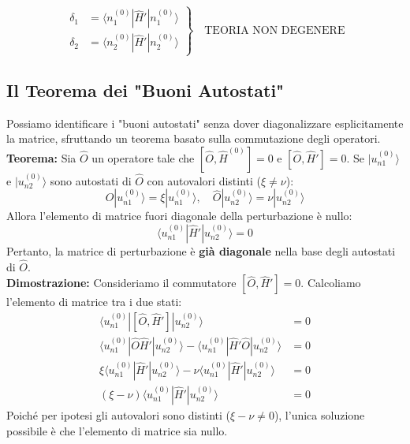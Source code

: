 \documentclass[11pt, a4paper]{article}
\begin{document}
\begin{equation*}
\left.
\begin{aligned}
\delta_1 &= \langle n_1^{(0)} | \hat{H}' | n_1^{(0)} \rangle \\
\delta_2 &= \langle n_2^{(0)} | \hat{H}' | n_2^{(0)} \rangle
\end{aligned}
\right\} \quad \text{TEORIA NON DEGENERE}
\end{equation*}

\subsection{Il Teorema dei "Buoni Autostati"}

Possiamo identificare i "buoni autostati" senza dover diagonalizzare esplicitamente la matrice, sfruttando un teorema basato sulla commutazione degli operatori.\\

\noindent
\textbf{Teorema:}
Sia $\hat{O}$ un operatore tale che $[\hat{O}, \hat{H}^{(0)}] = 0$ e $[\hat{O}, \hat{H}'] = 0$.
Se $|u_{n1}^{(0)}\rangle$ e $|u_{n2}^{(0)}\rangle$ sono autostati di $\hat{O}$ con autovalori distinti ($\xi \neq \nu$):
\begin{equation}
    \hat{O} |u_{n1}^{(0)}\rangle = \xi |u_{n1}^{(0)}\rangle, \quad \hat{O} |u_{n2}^{(0)}\rangle = \nu |u_{n2}^{(0)}\rangle
\end{equation}
Allora l'elemento di matrice fuori diagonale della perturbazione è nullo:
\begin{equation}
    \langle u_{n1}^{(0)} | \hat{H}' | u_{n2}^{(0)} \rangle = 0
\end{equation}
Pertanto, la matrice di perturbazione è \textbf{già diagonale} nella base degli autostati di $\hat{O}$.\\

\noindent
\textbf{Dimostrazione:}
Consideriamo il commutatore $[\hat{O}, \hat{H}'] = 0$. Calcoliamo l'elemento di matrice tra i due stati:
\begin{align*}
    \langle u_{n1}^{(0)} | [\hat{O}, \hat{H}'] | u_{n2}^{(0)} \rangle &= 0 \\
    \langle u_{n1}^{(0)} | \hat{O} \hat{H}' | u_{n2}^{(0)} \rangle - \langle u_{n1}^{(0)} | \hat{H}' \hat{O} | u_{n2}^{(0)} \rangle &= 0 \\
    \xi \langle u_{n1}^{(0)} | \hat{H}' | u_{n2}^{(0)} \rangle - \nu \langle u_{n1}^{(0)} | \hat{H}' | u_{n2}^{(0)} \rangle &= 0 \\
    (\xi - \nu) \langle u_{n1}^{(0)} | \hat{H}' | u_{n2}^{(0)} \rangle &= 0
\end{align*}
Poiché per ipotesi gli autovalori sono distinti ($\xi - \nu \neq 0$), l'unica soluzione possibile è che l'elemento di matrice sia nullo.
\end{document}
